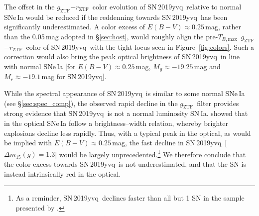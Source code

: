 \documentclass[twocolumn]{aastex63}
\newcommand{\fromkate}[1]{{\color{brown} fromKM: {#1}}}
\newcommand{\frommb}[1]{{\color{purple} fromMB: {#1}}}
\newcommand{\rztf}{$r_\mathrm{ZTF}$}
\newcommand{\gztf}{$g_\mathrm{ZTF}$}
\newcommand{\tbmax}{$T_{B,\mathrm{max}}$}
\newcommand{\sn}{SN\,2019yvq}
\begin{document}
The offset in the \gztf$ - $\rztf\ color evolution of \sn\ relative to normal
SNe\,Ia would be reduced if the reddenning towards \sn\ has been significantly
underestimated. A color excess of $E(B-V) \approx 0.25$\,mag, rather than the
0.05\,mag adopted in \S\ref{sec:host}, would roughly align the pre-\tbmax\
\gztf$ - $\rztf\ color of \sn\ with the tight locus seen in
Figure~\ref{fig:colors}. Such a correction would also bring the peak optical
brightness of \sn\ in line with normal SNe\,Ia [for $E(B-V) \approx
0.25$\,mag, $M_g \approx -19.25$\,mag and $M_r \approx -19.1$\,mag for \sn].

While the spectral appearance of \sn\ is similar to some normal SNe\,Ia (see
\S\ref{sec:spec_comp}), the observed rapid decline in the \gztf\ filter
provides strong evidence that \sn\ is not a normal luminosity SN\,Ia.
\citet{Phillips93} showed that in the optical SNe\,Ia follow a
brightness--width relation, whereby brighter explosions decline less rapidly.
Thus, with a typical peak in the optical, as would be implied with $E(B-V)
\approx 0.25$\,mag, the fast decline in \sn\ [$\Delta m_{15}(g) = 1.3$] would
be largely unprecedented.\footnote{As a reminder, \sn\ declines faster than
all but 1 SN in the sample presented by \citet{Yao19}.} We therefore conclude
that the color excess towards \sn\ is not underestimated, and that the SN is
instead intrinsically red in the optical.


\end{document}
